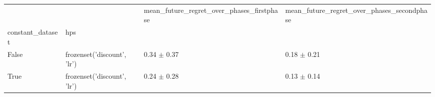 \begin{tabular}{llll}
\toprule
 &  & mean_future_regret_over_phases_firstphase & mean_future_regret_over_phases_secondphase \\
constant_dataset & hps &  &  \\
\midrule
False & frozenset({'discount', 'lr'}) & 0.34 $\pm$ 0.37 & 0.18 $\pm$ 0.21 \\
\cline{1-4}
True & frozenset({'discount', 'lr'}) & 0.24 $\pm$ 0.28 & 0.13 $\pm$ 0.14 \\
\cline{1-4}
\bottomrule
\end{tabular}

